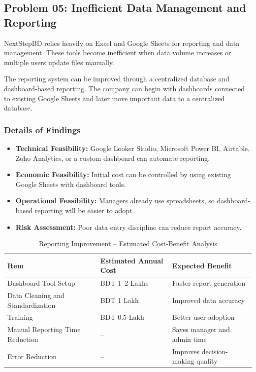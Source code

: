 \documentclass[12pt,a4paper]{report}
\begin{document}
\subsection{Problem 05: Inefficient Data Management and Reporting}

\begin{problemBox}
NextStepBD relies heavily on Excel and Google Sheets for reporting and data management. These tools become inefficient when data volume increases or multiple users update files manually.
\end{problemBox}

\begin{summaryBox}
The reporting system can be improved through a centralized database and dashboard-based reporting. The company can begin with dashboards connected to existing Google Sheets and later move important data to a centralized database.
\end{summaryBox}

\subsubsection{Details of Findings}

\begin{itemize}[leftmargin=*]
    \item \textbf{Technical Feasibility:} Google Looker Studio, Microsoft Power BI, Airtable, Zoho Analytics, or a custom dashboard can automate reporting.
    \item \textbf{Economic Feasibility:} Initial cost can be controlled by using existing Google Sheets with dashboard tools.
    \item \textbf{Operational Feasibility:} Managers already use spreadsheets, so dashboard-based reporting will be easier to adopt.
    \item \textbf{Risk Assessment:} Poor data entry discipline can reduce report accuracy.
\end{itemize}

\begin{table}[H]
\centering
\caption{Reporting Improvement -- Estimated Cost-Benefit Analysis}
\renewcommand{\arraystretch}{1.3}
\begin{tabularx}{\textwidth}{|p{5cm}|p{4cm}|X|}
\hline
\rowcolor{secondary}
\textbf{Item} & \textbf{Estimated Annual Cost} & \textbf{Expected Benefit} \\
\hline
Dashboard Tool Setup & BDT 1--2 Lakhs & Faster report generation \\
\hline
Data Cleaning and Standardization & BDT 1 Lakh & Improved data accuracy \\
\hline
Training & BDT 0.5 Lakh & Better user adoption \\
\hline
Manual Reporting Time Reduction & -- & Saves manager and admin time \\
\hline
Error Reduction & -- & Improves decision-making quality \\
\hline
\end{tabularx}
\end{table}
\end{document}
